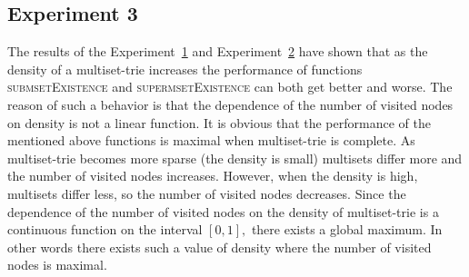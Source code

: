 %
%
%
%


\subsection{Experiment 3} \label{s:exp3}
The results of the Experiment~\hyperref[s:exp1]{1} and Experiment~\hyperref[s:exp2]{2} 
have shown that as the density of a multiset-trie increases the performance of 
functions \textsc{submsetExistence} and \textsc{supermsetExistence} can both get 
better and worse. The reason of such a behavior is that the dependence of the 
number of visited nodes on density is not a linear function. It is obvious that the 
performance of the mentioned above functions is maximal when multiset-trie is 
complete. As multiset-trie becomes more sparse (the density is small) multisets 
differ more and the number of visited nodes increases. However, when the density 
is high, multisets differ less, so the number of visited nodes decreases. Since 
the dependence of the number of visited nodes on the density of multiset-trie 
is a continuous function on the interval $[0,1],$ there exists a global maximum. 
In other words there exists such a value of density where the number of visited 
nodes is maximal. 

